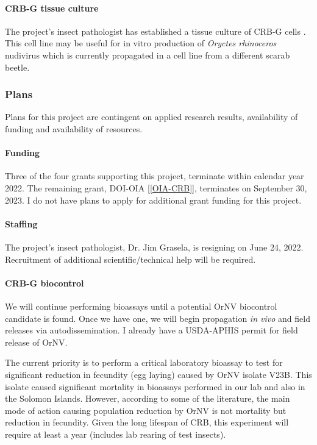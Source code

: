 \begin{refsection}
\paragraph{CRB-G tissue culture}
The project's insect pathologist has established a tissue culture of CRB-G cells \cite{grasela_preliminary_2022}.
This cell line may be useful for in vitro production of \textit{Oryctes rhinoceros} nudivirus which is currently propagated in a cell line from a different scarab beetle.

\subsubsection{Plans}

Plans for this project are contingent on applied research results, availability of funding and availability of resources.

\paragraph{Funding} 

Three of the four grants supporting this project, terminate within calendar year 2022. The remaining grant, DOI-OIA [\ref{OIA-CRB}], terminates on September 30, 2023. I do not have plans to apply for additional grant funding for this project.

\paragraph{Staffing}

The project's insect pathologist, Dr. Jim Grasela, is resigning on June 24, 2022. Recruitment of additional scientific/technical help will be required.

\paragraph{CRB-G biocontrol} 

We will continue performing bioassays until a potential OrNV biocontrol candidate is found. Once we have one, we will begin propagation \textit{in vivo} and field releases via autodissemination. I already have a USDA-APHIS permit for field release of OrNV.

The current priority is to perform a critical laboratory bioassay to test for significant reduction in fecundity (egg laying) caused by OrNV isolate V23B. This isolate caused significant mortality in bioassays performed in our lab and also in the Solomon Islands. However, according to some of the literature, the main mode of action causing population reduction by OrNV is not mortality but reduction in fecundity. Given the long lifespan of CRB, this experiment will require at least a year (includes lab rearing of test insects).


\end{refsection}
